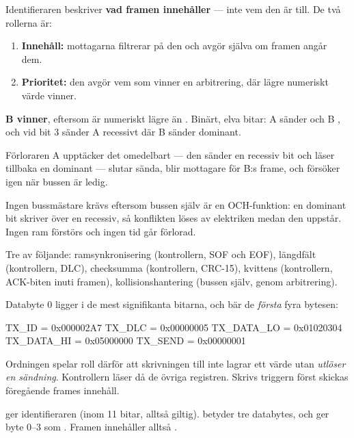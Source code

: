 Identifieraren beskriver \textbf{vad framen innehåller} --- inte vem den är till. De två
rollerna är:
\begin{enumerate}
  \item \textbf{Innehåll:} mottagarna filtrerar på den och avgör själva om framen angår dem.
  \item \textbf{Prioritet:} den avgör vem som vinner en arbitrering, där lägre numeriskt värde
    vinner.
\end{enumerate}

 \textbf{B vinner}, eftersom  är numeriskt lägre än . Binärt, elva
bitar: A sänder  och B , och vid bit 3 sänder A recessivt där
B sänder dominant.

Förloraren A upptäcker det omedelbart --- den sänder en recessiv bit och läser tillbaka en
dominant --- slutar sända, blir mottagare för B:s frame, och försöker igen när bussen är ledig.

Ingen bussmästare krävs eftersom bussen själv är en OCH-funktion: en dominant bit skriver över en
recessiv, så konflikten löses av elektriken medan den uppstår. Ingen ram förstörs och ingen tid
går förlorad.

 Tre av följande: ramsynkronisering (kontrollern, SOF och EOF), längdfält (kontrollern,
DLC), checksumma (kontrollern, CRC-15), kvittens (kontrollern, ACK-biten inuti framen),
kollisionshantering (bussen själv, genom arbitrering).

 Databyte 0 ligger i de mest signifikanta bitarna, och  bär de \emph{första}
fyra bytesen:

\begin{console}
TX_ID      = 0x000002A7
TX_DLC     = 0x00000005
TX_DATA_LO = 0x01020304
TX_DATA_HI = 0x05000000
TX_SEND    = 0x00000001
\end{console}

Ordningen spelar roll därför att skrivningen till  inte lagrar ett värde utan
\emph{utlöser en sändning}. Kontrollern läser då de övriga registren. Skrivs triggern först skickas
föregående frames innehåll.

  ger identifieraren \textbf{} (inom 11 bitar, alltså
giltig).  betyder tre databytes, och  ger byte 0--3
som . Framen innehåller alltså \textbf{}.

